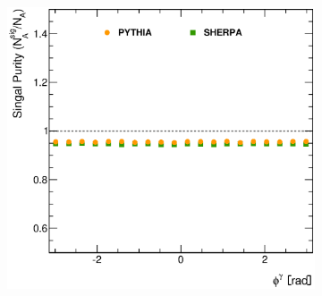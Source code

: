 \documentclass[12pt, twoside]{article}
\numberwithin{equation}{section}
\numberwithin{figure}{section}
\newenvironment{changemargin}[2]{%
\begin{list}{}{%
\setlength{\topsep}{0pt}%
\setlength{\leftmargin}{#1}%
\setlength{\rightmargin}{#2}%
\setlength{\listparindent}{\parindent}%
\setlength{\itemindent}{\parindent}%
\setlength{\parsep}{\parskip}%
}%
\item[]}{\end{list}}
\begin{document}
\begin{figure}
\begin{changemargin}{-1.0cm}{-0.75cm}
\begin{changemargin}{-0.75cm}{-1.0cm}
\begin{subfigure}[b]{0.37\textwidth}
            \subcaption{}
            \label{fig:PurityEtaPhoton}
        \end{subfigure}
        \begin{subfigure}[b]{0.37\textwidth}
            \includegraphics[width=\textwidth]{./images/SignalPurity/SIG_PUR-103.eps}
            \subcaption{}
            \label{fig:PurityPhiPhoton}
        \end{subfigure}


\end{changemargin}
\end{changemargin}
\end{figure}
\end{document}
